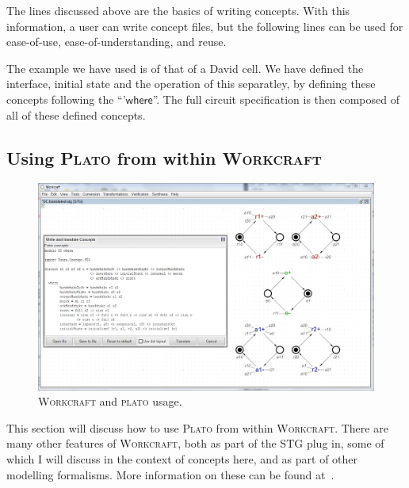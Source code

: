 \documentclass[british,conference,compsoc]{IEEEtran}
\newcommand{\noun}[1]{\textsc{#1}}
\begin{document}
\vspace{-1mm}

The lines discussed above are the basics of writing concepts. With this 
information, a user can write concept files, but the following lines can be 
used for ease-of-use, ease-of-understanding, and reuse. 

The example we have used is of that of a David cell. We have defined the 
interface, initial state and the operation of this separatley, by defining 
these concepts following the ``'$\mathsf{where}$''. The full circuit 
specification is then composed of all of these defined concepts. 

\subsection{Using \noun{Plato} from within \noun{Workcraft} \label{sec:workcraft_usage}}

\vspace{-2mm}

\begin{figure}[H]
\begin{centering}
\vspace{-3mm}
\includegraphics[scale=0.25]{Images/workcraft_design_flow.JPG}
\par\end{centering}
\begin{centering}
\protect\caption{\label{fig:design_flow_screenshot}\noun{Workcraft} and 
			\noun{plato} usage.}
\par\end{centering}
\vspace{-3mm}
\end{figure}

This section will discuss how to use \noun{Plato} from within
\noun{Workcraft}. There are many other features of \noun{Workcraft}, both as 
part of the STG plug in, some of which I will discuss in the context of 
concepts here, and as part of other modelling formalisms. More information on 
these can be found at~\cite{Workcraft_website}.
\end{document}
